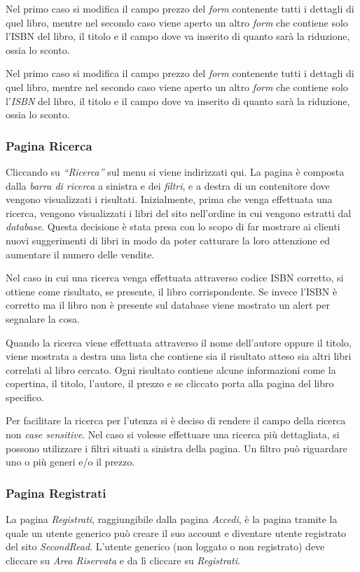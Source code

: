 Nel primo caso si modifica il campo prezzo del \textit{form} contenente tutti i dettagli di quel libro, mentre nel secondo caso viene aperto un altro \textit{form} che contiene solo l’ISBN del libro, il titolo e il campo dove va inserito di quanto sarà la riduzione, ossia lo sconto.

Nel primo caso si modifica il campo prezzo del \textit{form} contenente tutti i dettagli di quel libro, mentre nel secondo caso viene aperto un altro \textit{form} che contiene solo l’\textit{ISBN} del libro, il titolo e il campo dove va inserito di quanto sarà la riduzione, ossia lo sconto.

\subsubsection{Pagina Ricerca}
Cliccando su \textit{“Ricerca”} sul menu si viene indirizzati qui. La pagina è composta dalla \textit{barra di ricerca} a sinistra e dei \textit{filtri}, e a destra di un contenitore dove vengono visualizzati i risultati. Inizialmente, prima che venga effettuata una ricerca, vengono visualizzati i libri del sito nell'ordine in cui vengono estratti dal \textit{database}. Questa decisione è stata presa con lo scopo di far mostrare ai clienti nuovi suggerimenti di libri in modo da poter catturare la loro attenzione ed aumentare il numero delle vendite.

Nel caso in cui una ricerca venga effettuata attraverso codice ISBN corretto, si ottiene come risultato, se presente, il libro corrispondente. Se invece l’ISBN è corretto ma il libro non è presente sul database viene mostrato un alert per segnalare la cosa.

Quando la ricerca viene effettuata attraverso il nome dell’autore oppure il titolo, viene mostrata a destra una lista che contiene sia il risultato atteso sia altri libri correlati al libro cercato. Ogni risultato contiene alcune informazioni come la copertina, il titolo, l’autore, il prezzo e se cliccato porta alla pagina del libro specifico.

Per facilitare la ricerca per l’utenza si è deciso di rendere il campo della ricerca non \textit{case sensitive}. Nel caso si volesse effettuare una ricerca più dettagliata, si possono utilizzare i filtri situati a sinistra della pagina. Un filtro può riguardare uno o più generi e/o il prezzo.

\subsubsection{Pagina Registrati}
La pagina \textit{Registrati}, raggiungibile dalla pagina \textit{Accedi}, è la pagina tramite la quale un utente generico può creare il suo account e diventare utente registrato del sito \textit{SecondRead}. L’utente generico (non loggato o non registrato) deve cliccare su \textit{Area Riservata} e da lì cliccare su \textit{Registrati}.

